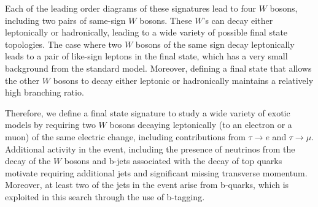 
Each of the leading order diagrams of these signatures lead to four $W$ bosons, including two pairs of same-sign $W$ bosons.
These $W$'s can decay either leptonically or hadronically, leading to a wide variety of possible final state topologies.
The case where two $W$ bosons of the same sign decay leptonically leads to a pair of like-sign leptons in the final state, which has a very small background from the standard model.
Moreover, defining a final state that allows the other $W$ bosons to decay either leptonic or hadronically maintains a relatively high branching ratio.


Therefore, we define a final state signature to study a wide variety of exotic models by requiring two $W$ bosons decaying leptonically (to an electron or a muon) of the same electric change, including contributions from $\tau\rightarrow e$ and $\tau\rightarrow\mu$.
Additional activity in the event, including the presence of neutrinos from the decay of the $W$ bosons and b-jets associated with the decay of top quarks motivate requiring additional jets and significant missing transverse momentum.
Moreover, at least two of the jets in the event arise from b-quarks, which is exploited in this search through the use of b-tagging.


